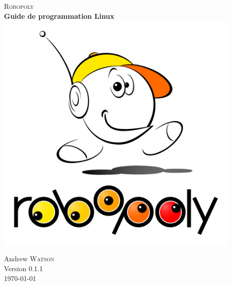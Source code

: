 


\begin{titlepage}
\nocite{*}      %
  \begin{center}
     
     
     
    \vfill 
    \textsc{\LARGE Robopoly }\\[1.0cm]

    { \huge \bfseries Guide de programmation Linux}\\[0.4cm]
    \includegraphics[width=12cm]{images/robo_bobo_blanc_big}\\[0.5cm]

    \vfill

     
    Andrew \textsc{Watson}\\[0.5cm] 
    Version 0.1.1\\[0.5cm]
    {\large \today} 
     
  \end{center}

\end{titlepage}


